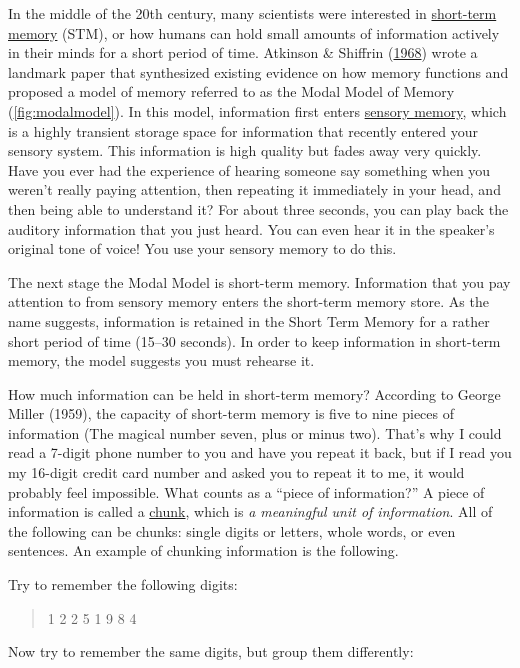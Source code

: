 \documentclass[
]{krantz}
\begin{document}
In the middle of the 20th century, many scientists were interested in \protect\hyperlink{short-term-memory}{short-term memory} (STM), or how humans can hold small amounts of information actively in their minds for a short period of time. Atkinson \& Shiffrin (\protect\hyperlink{ref-atkinson1968human}{1968}) wrote a landmark paper that synthesized existing evidence on how memory functions and proposed a model of memory referred to as the Modal Model of Memory (\ref{fig:modalmodel}). In this model, information first enters \protect\hyperlink{sensory-memory}{sensory memory}, which is a highly transient storage space for information that recently entered your sensory system. This information is high quality but fades away very quickly. Have you ever had the experience of hearing someone say something when you weren't really paying attention, then repeating it immediately in your head, and then being able to understand it? For about three seconds, you can play back the auditory information that you just heard. You can even hear it in the speaker's original tone of voice! You use your sensory memory to do this.

The next stage the Modal Model is short-term memory. Information that you pay attention to from sensory memory enters the short-term memory store. As the name suggests, information is retained in the Short Term Memory for a rather short period of time (15--30 seconds). In order to keep information in short-term memory, the model suggests you must rehearse it.

How much information can be held in short-term memory? According to George Miller (1959), the capacity of short-term memory is five to nine pieces of information (The magical number seven, plus or minus two). That's why I could read a 7-digit phone number to you and have you repeat it back, but if I read you my 16-digit credit card number and asked you to repeat it to me, it would probably feel impossible. What counts as a ``piece of information?'' A piece of information is called a \protect\hyperlink{chunk}{chunk}, which is \emph{a meaningful unit of information}. All of the following can be chunks: single digits or letters, whole words, or even sentences. An example of chunking information is the following.

Try to remember the following digits:

\begin{quote}
1 2 2 5 1 9 8 4
\end{quote}

Now try to remember the same digits, but group them differently:
\end{document}
